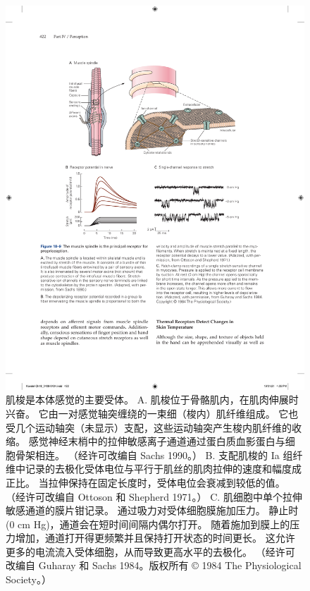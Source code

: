 \begin{figure}[htbp]
	\centering
	\includegraphics[width=1.0\linewidth]{chap18/fig_18_9}
	\caption{肌梭是本体感觉的主要受体。 
		A. 肌梭位于骨骼肌内，在肌肉伸展时兴奋。 
		它由一对感觉轴突缠绕的一束细（梭内）肌纤维组成。 
		它也受几个运动轴突（未显示）支配，这些运动轴突产生梭内肌纤维的收缩。 
		感觉神经末梢中的拉伸敏感离子通道通过蛋白质血影蛋白与细胞骨架相连。 （经许可改编自 Sachs 1990。） 
		B. 支配肌梭的 Ia 组纤维中记录的去极化受体电位与平行于肌丝的肌肉拉伸的速度和幅度成正比。 
		当拉伸保持在固定长度时，受体电位会衰减到较低的值。 （经许可改编自 Ottoson 和 Shepherd 1971。）
		C. 肌细胞中单个拉伸敏感通道的膜片钳记录。 通过吸力对受体细胞膜施加压力。 
		静止时 (0 cm Hg)，通道会在短时间间隔内偶尔打开。 
		随着施加到膜上的压力增加，通道打开得更频繁并且保持打开状态的时间更长。 
		这允许更多的电流流入受体细胞，从而导致更高水平的去极化。 （经许可改编自 Guharay 和 Sachs 1984。版权所有 © 1984 The Physiological Society。）}
	\label{fig:18_9}
\end{figure}

